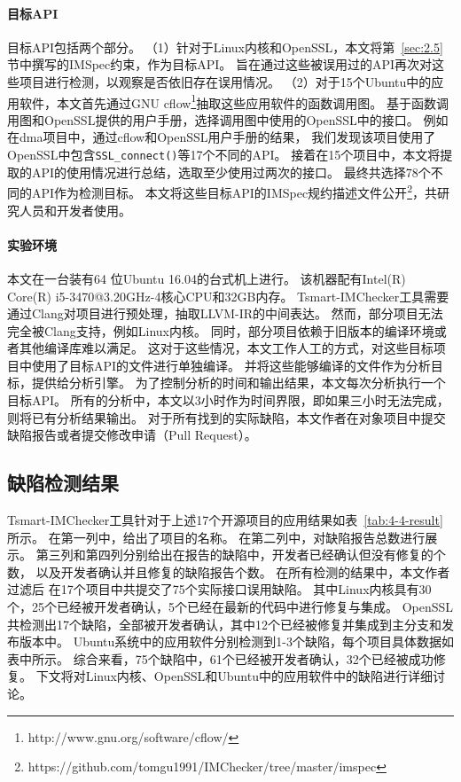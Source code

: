 \paragraph{目标API}
目标API包括两个部分。
（1）针对于Linux内核和OpenSSL，本文将第~\ref{sec:2.5}节中撰写的IMSpec约束，作为目标API。
旨在通过这些被误用过的API再次对这些项目进行检测，以观察是否依旧存在误用情况。
（2）对于15个Ubuntu中的应用软件，本文首先通过GNU cflow\footnote{http://www.gnu.org/software/cflow/}抽取这些应用软件的函数调用图。
基于函数调用图和OpenSSL提供的用户手册，选择调用图中使用的OpenSSL中的接口。
例如在dma项目中，通过cflow和OpenSSL用户手册的结果，
我们发现该项目使用了OpenSSL中包含\texttt{SSL\_connect()}等17个不同的API。
接着在15个项目中，本文将提取的API的使用情况进行总结，选取至少使用过两次的接口。
最终共选择78个不同的API作为检测目标。
本文将这些目标API的IMSpec规约描述文件公开\footnote{https://github.com/tomgu1991/IMChecker/tree/master/imspec}，共研究人员和开发者使用。

\paragraph{实验环境}
本文在一台装有64 位Ubuntu 16.04的台式机上进行。
该机器配有Intel(R) Core(R) i5-3470@3.20GHz-4核心CPU和32GB内存。
Tsmart-IMChecker工具需要通过Clang对项目进行预处理，抽取LLVM-IR的中间表达。
然而，部分项目无法完全被Clang支持，例如Linux内核。
同时，部分项目依赖于旧版本的编译环境或者其他编译库难以满足。
这对于这些情况，本文工作人工的方式，对这些目标项目中使用了目标API的文件进行单独编译。
并将这些能够编译的文件作为分析目标，提供给分析引擎。
为了控制分析的时间和输出结果，本文每次分析执行一个目标API。
所有的分析中，本文以3小时作为时间界限，即如果三小时无法完成，则将已有分析结果输出。
对于所有找到的实际缺陷，本文作者在对象项目中提交缺陷报告或者提交修改申请（Pull Request）。

\subsection{缺陷检测结果}

Tsmart-IMChecker工具针对于上述17个开源项目的应用结果如表~\ref{tab:4-4-result}所示。
在第一列中，给出了项目的名称。
在第二列中，对缺陷报告总数进行展示。
第三列和第四列分别给出在报告的缺陷中，开发者已经确认但没有修复的个数，
以及开发者确认并且修复的缺陷报告个数。
在所有检测的结果中，本文作者过滤后
在17个项目中共提交了75个实际接口误用缺陷。
其中Linux内核具有30个，25个已经被开发者确认，5个已经在最新的代码中进行修复与集成。
OpenSSL共检测出17个缺陷，全部被开发者确认，其中12个已经被修复并集成到主分支和发布版本中。
Ubuntu系统中的应用软件分别检测到1-3个缺陷，每个项目具体数据如表中所示。
综合来看，75个缺陷中，61个已经被开发者确认，32个已经被成功修复。
下文将对Linux内核、OpenSSL和Ubuntu中的应用软件中的缺陷进行详细讨论。

